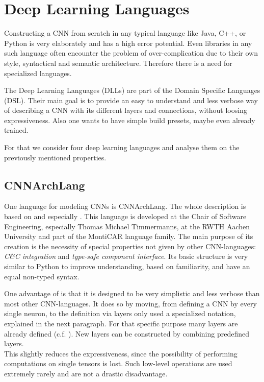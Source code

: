 \chapter{Deep Learning Languages}\label{chapter: DLL}

Constructing a CNN from scratch in any typical language like Java, C++, or Python is very elaborately and has a high error potential. Even libraries in any such language often encounter the problem of over-complication due to their own style, syntactical and semantic architecture. Therefore there is a need for specialized languages.

The Deep Learning Languages (DLLs) are part of the Domain Specific Languages (DSL). Their main goal is to provide an easy to understand and less verbose way of describing a CNN with its different layers and connections, without loosing expressiveness. Also one wants to have simple build presets, maybe even already trained.

For that we consider four deep learning languages and analyse them on the previously mentioned properties.

\section{CNNArchLang}\label{sec: CNNArch}

One language for modeling CNNs is CNNArchLang.
The whole description is based on\cite{CNNArch} and especially \cite{tim2018CNNArchLang}. This language is developed at the Chair of Software Engineering, especially Thomas Michael Timmermanns,  at the RWTH Aachen University and part of the MontiCAR language family. The main purpose of its creation is the necessity of special properties not given by other CNN-languages: \textit{C\&C integration} and \textit{type-safe component interface}. Its basic structure is very similar to Python to improve understanding, based on familiarity, and have an equal non-typed syntax. 

One advantage of \cnnarch is that it is designed to be very simplistic and less verbose than most other CNN-languages. It does so by moving, from defining a CNN by every single neuron, to the definition via layers only used a specialized notation, explained in the next paragraph. For that specific purpose many layers are already defined (c.f. ). 
New layers can be constructed by combining predefined layers.\\
This slightly reduces the expressiveness, since the possibility of performing computations on single tensors is lost. Such low-level operations are used extremely rarely and are not a drastic disadvantage.


